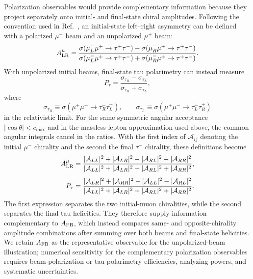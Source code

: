 \documentclass[12pt,a4paper]{article}
\begin{document}
Polarization observables would provide complementary information because they project separately onto initial- and final-state chiral amplitudes. Following the convention used in Ref.~\cite{Huang:2021nkl}, an initial-state left--right asymmetry can be defined with a polarized \(\mu^-\) beam and an unpolarized \(\mu^+\) beam:
\[
A_{\rm LR}^{\mu}
=
\frac{\sigma(\mu^-_L\mu^+\to\tau^+\tau^-)-\sigma(\mu^-_R\mu^+\to\tau^+\tau^-)}
{\sigma(\mu^-_L\mu^+\to\tau^+\tau^-)+\sigma(\mu^-_R\mu^+\to\tau^+\tau^-)}.
\]
With unpolarized initial beams, final-state tau polarimetry can instead measure
\[
P_\tau
=
\frac{\sigma_{\tau_R}-\sigma_{\tau_L}}
{\sigma_{\tau_R}+\sigma_{\tau_L}},
\]
where
\[
\sigma_{\tau_R}\equiv\sigma(\mu^+\mu^-\to\tau^-_R\tau^+_L),\qquad
\sigma_{\tau_L}\equiv\sigma(\mu^+\mu^-\to\tau^-_L\tau^+_R)
\]
in the relativistic limit. For the same symmetric angular acceptance \(|\cos\theta|<c_{\max}\) and in the massless-lepton approximation used above, the common angular integrals cancel in the ratios. With the first index of \(\mathcal A_{ij}\) denoting the initial \(\mu^-\) chirality and the second the final \(\tau^-\) chirality, these definitions become
\[
\begin{aligned}
A_{\rm LR}^{\mu}
&=
\frac{|\mathcal A_{LL}|^2+|\mathcal A_{LR}|^2
      -|\mathcal A_{RL}|^2-|\mathcal A_{RR}|^2}
     {|\mathcal A_{LL}|^2+|\mathcal A_{LR}|^2
      +|\mathcal A_{RL}|^2+|\mathcal A_{RR}|^2},\\[4pt]
P_\tau
&=
\frac{|\mathcal A_{LR}|^2+|\mathcal A_{RR}|^2
      -|\mathcal A_{LL}|^2-|\mathcal A_{RL}|^2}
     {|\mathcal A_{LL}|^2+|\mathcal A_{LR}|^2
      +|\mathcal A_{RL}|^2+|\mathcal A_{RR}|^2}.
\end{aligned}
\]
The first expression separates the two initial-muon chiralities, while the second separates the final tau helicities. They therefore supply information complementary to \(A_{\rm FB}\), which instead compares same- and opposite-chirality amplitude combinations after summing over both beams and final-state helicities. We retain \(A_{\rm FB}\) as the representative observable for the unpolarized-beam illustration; numerical sensitivity for the complementary polarization observables requires beam-polarization or tau-polarimetry efficiencies, analyzing powers, and systematic uncertainties.
\end{document}

